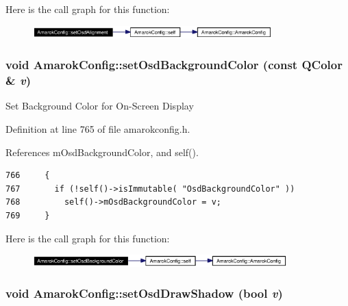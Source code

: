 Here is the call graph for this function:\begin{figure}[H]
\begin{center}
\leavevmode
\includegraphics[width=262pt]{classAmarokConfig_AmarokConfige89_cgraph}
\end{center}
\end{figure}
\subsubsection{\setlength{\rightskip}{0pt plus 5cm}void Amarok\-Config::set\-Osd\-Background\-Color (const QColor \& {\em v})\hspace{0.3cm}{\tt  [inline, static]}}\label{classAmarokConfig_AmarokConfige79}


Set Background Color for On-Screen Display 

Definition at line 765 of file amarokconfig.h.

References m\-Osd\-Background\-Color, and self().



\footnotesize\begin{verbatim}766     {
767       if (!self()->isImmutable( "OsdBackgroundColor" ))
768         self()->mOsdBackgroundColor = v;
769     }
\end{verbatim}\normalsize 


Here is the call graph for this function:\begin{figure}[H]
\begin{center}
\leavevmode
\includegraphics[width=278pt]{classAmarokConfig_AmarokConfige79_cgraph}
\end{center}
\end{figure}
\subsubsection{\setlength{\rightskip}{0pt plus 5cm}void Amarok\-Config::set\-Osd\-Draw\-Shadow (bool {\em v})\hspace{0.3cm}{\tt  [inline, static]}}\label{classAmarokConfig_AmarokConfige73}


